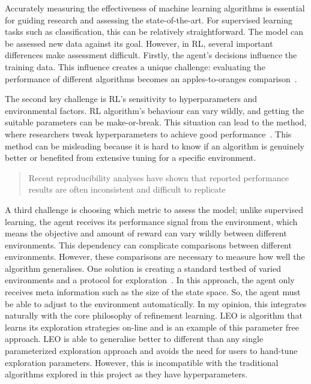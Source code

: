 \documentclass[]{final_report}
\begin{document}
Accurately measuring the effectiveness of machine learning algorithms is essential for guiding research and assessing the state-of-the-art. For supervised learning tasks such as classification, this can be relatively straightforward. The model can be assessed new data against its goal. However, in RL, several important differences make assessment difficult. Firstly, the agent's decisions influence the training data. This influence creates a unique challenge: evaluating the performance of different algorithms becomes an apples-to-oranges comparison~\cite{sutton2018reinforcement}.

The second key challenge is RL's sensitivity to hyperparameters and environmental factors. RL algorithm's behaviour can vary wildly, and getting the suitable parameters can be make-or-break. This situation can lead to the  method, where researchers tweak hyperparameters to achieve good performance~\cite{evaluatingRL}. This method can be misleading because it is hard to know if an algorithm is genuinely better or benefited from extensive tuning for a specific environment. 

\begin{quote}
  Recent reproducibility analyses have shown that reported performance results are often inconsistent and difficult to replicate~\cite{evaluatingRL}
\end{quote}

\newpage
A third challenge is choosing which metric to assess the model; unlike supervised learning, the agent receives its performance signal from the environment, which means the objective and amount of reward can vary wildly between different environments. This dependency can complicate comparisons between different environments. However, these comparisons are necessary to measure how well the algorithm generalises. One solution is creating a standard testbed of varied environments and a protocol for exploration~\cite{assessingDeepRL, evaluatingRL}. In this approach, the agent only receives meta information such as the size of the state space. So, the agent must be able to adjust to the environment automatically. In my opinion, this integrates naturally with the core philosophy of refinement learning. LEO is algorithm that learns its exploration strategies on-line and is an example of this parameter free approach\cite{parameterFreeExploration}. LEO is able to generalise better to different than any single parameterized exploration approach and avoids the need for users to hand-tune exploration parameters\cite{parameterFreeExploration}. However, this is incompatible with the traditional algorithms explored in this project as they have hyperparameters.
\end{document}
